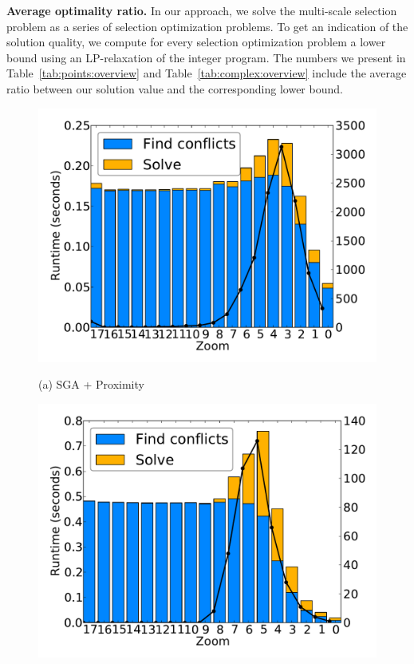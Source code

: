 \documentclass[11pt, oneside]{report}
\newcommand{\minisec}[1]{\noindent\textbf{#1.}}
\begin{document}
{\minisec{Average optimality ratio}
In our approach, we solve the multi-scale selection problem as a series of selection optimization problems. To get an indication of the solution quality, we compute for every selection optimization problem a lower bound using an LP-relaxation of the integer program. The numbers we present in Table~\ref{tab:points:overview} and Table~\ref{tab:complex:overview} include the average ratio between our solution value and the corresponding lower bound.


\begin{figure}[tb]
  \begin{minipage}{0.329\linewidth}
    \centerline{\includegraphics[width=0.9\linewidth]{./figs-cvl/prelim_pnt_7k_airports_heuristic_B.pdf}}
    \centerline{(a) SGA + Proximity}
  \end{minipage} \hfill
  \begin{minipage}{0.329\linewidth}
    \centerline{\includegraphics[width=0.9\linewidth]{./figs-cvl/prelim_pnt_7k_airports_lp_A.pdf}}

\end{minipage}
\end{figure}}
\end{document}
